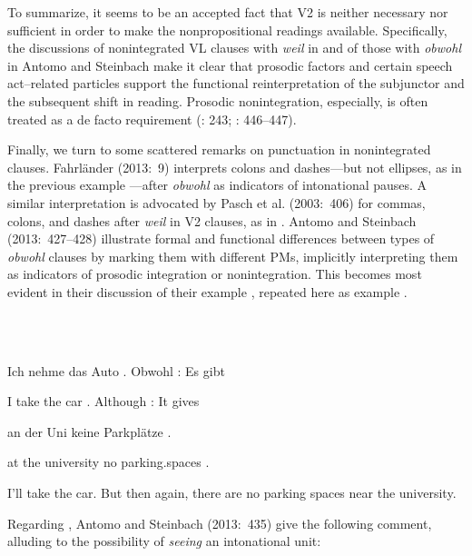 To summarize, it seems to be an accepted fact that V2 is neither necessary nor sufficient in order to make the nonpropositional readings available. Specifically, the discussions of nonintegrated VL clauses with \textit{weil} in \citet{Reis2013} and of those with \textit{obwohl} in Antomo and Stein\-bach  make it clear that prosodic factors and certain speech act–related particles support the functional reinterpretation of the subjunctor and the subse\-quent shift in reading. Prosodic nonintegration, especially, is often treated as a de facto requirement (\citealt{Reis2013}: 243; \citealt{AntomoSteinbach2013}: 446–447).



Finally, we turn to some scattered remarks on punctuation in nonintegrated clauses. Fahrländer (2013:~9) interprets colons and dashes—but not ellipses, as in the previous example —after \textit{obwohl} as indicators of intonational pauses. A similar interpre\-tation is advocated by Pasch et al. (2003:~406) for commas, colons, and dashes after \textit{weil} in V2 clauses, as in . Antomo and Steinbach (2013:~427–428) illustrate formal and functional differences between types of \textit{obwohl} clauses by marking them with different PMs, implicitly interpreting them as indicators of prosodic integration or nonintegration. This becomes most evident in their discussion of their example , repeated here as example .



\ea%
    \label{ex:key:5}
    \gll\\
        \\
    \glt
    \z

          Ich  nehme  das  Auto  .  Obwohl  :  Es  gibt



I  take    the  car  .  Although  :  It  gives



an  der  Uni    keine  Parkplätze    .



at  the  university  no  parking.spaces  .



I’ll take the car. But then again, there are no parking spaces near the uni\-versity.



Regarding , Antomo and Steinbach (2013:~435) give the following comment, alluding to the possibility of \textit{seeing} an intonational unit:



